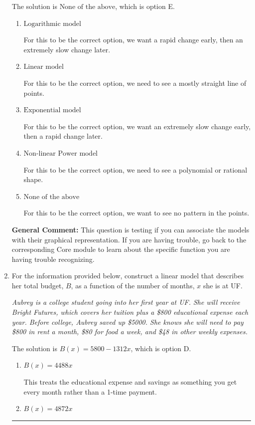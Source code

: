 \documentclass{extbook}[14pt]
\newcommand{\litem}[1]{\item #1

\rule{\textwidth}{0.4pt}}
\begin{document}
\begin{enumerate}
{The solution is \( \text{None of the above} \), which is option E.\begin{enumerate}[label=\Alph*.]
\item \( \text{Logarithmic model} \)

For this to be the correct option, we want a rapid change early, then an extremely slow change later.
\item \( \text{Linear model} \)

For this to be the correct option, we need to see a mostly straight line of points.
\item \( \text{Exponential model} \)

For this to be the correct option, we want an extremely slow change early, then a rapid change later.
\item \( \text{Non-linear Power model} \)

For this to be the correct option, we need to see a polynomial or rational shape.
\item \( \text{None of the above} \)

For this to be the correct option, we want to see no pattern in the points.
\end{enumerate}

\textbf{General Comment:} This question is testing if you can associate the models with their graphical representation. If you are having trouble, go back to the corresponding Core module to learn about the specific function you are having trouble recognizing.
}
\litem{
For the information provided below, construct a linear model that describes her total budget, $B$, as a function of the number of months, $x$ she is at UF.

\begin{center}
    \textit{ Aubrey is a college student going into her first year at UF. She will receive Bright Futures, which covers her tuition plus a \$800 educational expense each year. Before college, Aubrey saved up \$5000. She knows she will need to pay \$800 in rent a month, \$80 for food a week, and \$48 in other weekly expenses. }
\end{center}
The solution is \( B(x) = 5800 - 1312 x \), which is option D.\begin{enumerate}[label=\Alph*.]
\item \( B(x) = 4488 x \)

This treats the educational expense and savings as something you get every month rather than a 1-time payment.
\item \( B(x) = 4872 x \)


\end{enumerate}}
\end{enumerate}
\end{document}
